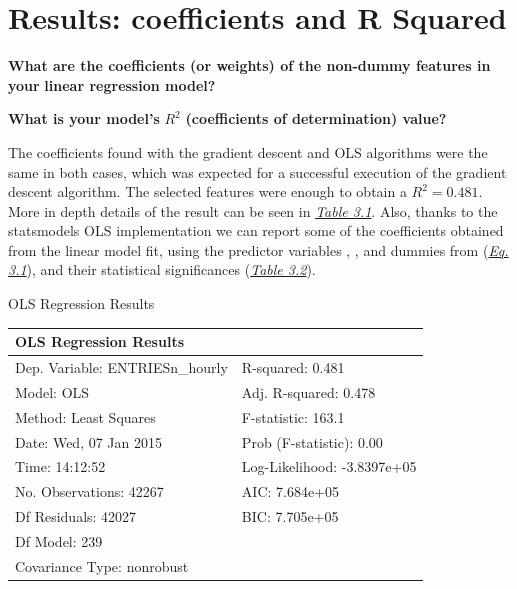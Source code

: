 \documentclass[a4paper,12pt,english]{sphinxmanual}
\begin{document}
\section{Results: coefficients and R Squared}
\label{section2:results-coefficients-and-r-squared}
\textbf{What are the coefficients (or weights) of the non-dummy features in your}
\textbf{linear regression model?}

\textbf{What is your model’s} \(R^2\) \textbf{(coefficients of determination) value?}

The coefficients found with the gradient descent and OLS algorithms were the
same in both cases, which was expected for a successful execution of the
gradient descent algorithm. The selected features were enough to obtain a
\(R^2 = 0.481\). More in depth details of the result can be seen in
{\hyperref[section2:table31]{\emph{Table 3.1}}}. Also, thanks to the statsmodels OLS implementation
we can report some of the coefficients obtained from the linear model fit,
using the predictor variables , ,  and dummies from
 ({\hyperref[section2:multreg-mod]{\emph{Eq. 3.1}}}), and their statistical significances
({\hyperref[section2:table32]{\emph{Table 3.2}}}).
\label{section2:table31}

\begin{threeparttable}
\capstart\caption{OLS Regression Results}

\begin{tabulary}{\linewidth}{|L|L|}
\hline
\textsf{\relax 
OLS Regression Results
} & \textsf{\relax }\\
\hline
Dep. Variable:        ENTRIESn\_hourly
 & 
R-squared:                       0.481
\\

Model:                            OLS
 & 
Adj. R-squared:                  0.478
\\

Method:                 Least Squares
 & 
F-statistic:                     163.1
\\

Date:                Wed, 07 Jan 2015
 & 
Prob (F-statistic):               0.00
\\

Time:                        14:12:52
 & 
Log-Likelihood:            -3.8397e+05
\\

No. Observations:               42267
 & 
AIC:                         7.684e+05
\\

Df Residuals:                   42027
 & 
BIC:                         7.705e+05
\\

Df Model:                         239
 & \\

Covariance Type:            nonrobust
 & \\
\hline\end{tabulary}

\end{threeparttable}
\end{document}
